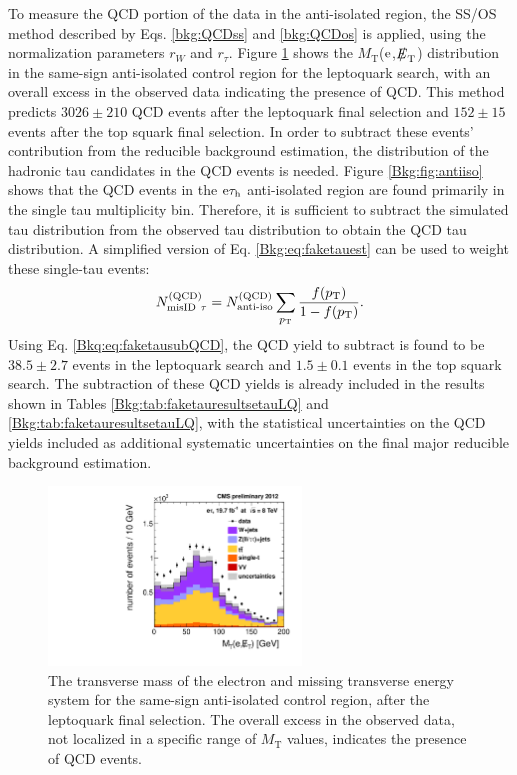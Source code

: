 \documentclass[12pt]{thesis}  %
\newcommand{\tauh}{\ensuremath{\tau_{\text{h}}}\xspace}
\newcommand{\Pe}{\ensuremath{\cmsSymbolFace{e}}\xspace}
\newcommand{\etau}{\ensuremath{\Pe\tauh}\xspace}
\def\eslash{\ensuremath{{\hbox{$E$\kern-0.6em\lower-.05ex\hbox{/}\kern0.10em}}}}
\def\met{\mbox{$\eslash_\text{T}$}\xspace} %
\newcommand{\MT}{\ensuremath{{M}_{\text{T}}}\xspace}%
\begin{document}
To measure the QCD portion of the data in the anti-isolated region, the SS/OS method described by Eqs. \eqref{bkg:QCDss} and \eqref{bkg:QCDos} is applied, using the normalization parameters $r_{W}$ and $r_{\tau}$. Figure \ref{fig:QCDSSAiso} shows the \MT(\Pe,\met) distribution in the same-sign anti-isolated control region for the leptoquark search, with an overall excess in the observed data indicating the presence of QCD. This method predicts $3026\pm210$ QCD events after the leptoquark final selection and $152\pm15$ events after the top squark final selection. In order to subtract these events' contribution from the reducible background estimation, the \pt distribution of the hadronic tau candidates in the QCD events is needed. Figure \ref{Bkg:fig:antiiso} shows that the QCD events in the \etau anti-isolated region are found primarily in the single tau multiplicity bin. Therefore, it is sufficient to subtract the simulated tau \pt distribution from the observed tau \pt distribution to obtain the QCD tau \pt distribution. A simplified version of Eq. \eqref{Bkg:eq:faketauest} can be used to weight these single-tau events:
\begin{equation}
N_{\text{misID}~\tau}^{\text{(QCD)}} = N_{\text{anti-iso}}^{\text{(QCD)}} \sum_{p_{\mathrm{T}}}{\frac{f(p_{\mathrm{T}})}{1-f(p_{\mathrm{T}})}}. \label{Bkq:eq:faketausubQCD}
\end{equation}
Using Eq. \eqref{Bkq:eq:faketausubQCD}, the QCD yield to subtract is found to be $38.5\pm2.7$ events in the leptoquark search and $1.5\pm0.1$ events in the top squark search. The subtraction of these QCD yields is already included in the results shown in Tables \ref{Bkg:tab:faketauresultsetauLQ} and \ref{Bkg:tab:faketauresultsetauLQ}, with the statistical uncertainties on the QCD yields included as additional systematic uncertainties on the final major reducible background estimation.

\begin{figure}[hbt]
  \begin{center}
    \includegraphics[width=0.6\textwidth]{figures/etau/eMETTMassSSAIsoFinal.pdf}
    \caption{The transverse mass of the electron and missing transverse energy system for the same-sign anti-isolated control region, after the leptoquark final selection. The overall excess in the observed data, not localized in a specific range of \MT values, indicates the presence of QCD events.}
    \label{fig:QCDSSAiso}
  \end{center}
\end{figure}
\end{document}
